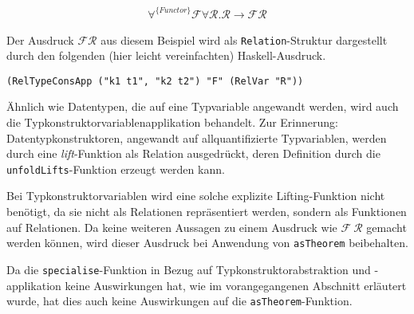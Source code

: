 
\begin{align*}
\forall^{\{Functor\}} \mathcal{F} \forall \mathcal{R} . \mathcal{R} \rightarrow \mathcal{F} \mathcal{R}
\end{align*}

Der Ausdruck $\mathcal{F} \mathcal{R}$ aus diesem Beispiel wird als \texttt{Relation}-Struktur dargestellt durch den folgenden
(hier leicht vereinfachten) Haskell-Ausdruck.

\begin{verbatim}
(RelTypeConsApp ("k1 t1", "k2 t2") "F" (RelVar "R"))
\end{verbatim}


Ähnlich wie Datentypen, die auf eine Typvariable angewandt werden, wird auch die Typkonstruktorvariablenapplikation
behandelt. Zur Erinnerung: Datentypkonstruktoren, angewandt auf allquantifizierte Typvariablen, werden durch eine
\textit{lift}-Funktion als Relation ausgedrückt, deren Definition durch die \texttt{unfoldLifts}-Funktion erzeugt werden kann.

Bei Typkonstruktorvariablen wird eine solche explizite Lifting-Funktion nicht benötigt, da sie nicht als Relationen repräsentiert
werden, sondern als Funktionen auf Relationen. Da keine weiteren Aussagen zu einem Ausdruck wie $\mathcal{F}\ \mathcal{R}$
gemacht werden können, wird dieser Ausdruck bei Anwendung von \texttt{asTheorem} beibehalten.

Da die \texttt{specialise}-Funktion in Bezug auf Typkonstruktorabstraktion und -applikation keine Auswirkungen hat, wie im
vorangegangenen Abschnitt erläutert wurde, hat dies auch keine Auswirkungen auf die \texttt{asTheorem}-Funktion.



